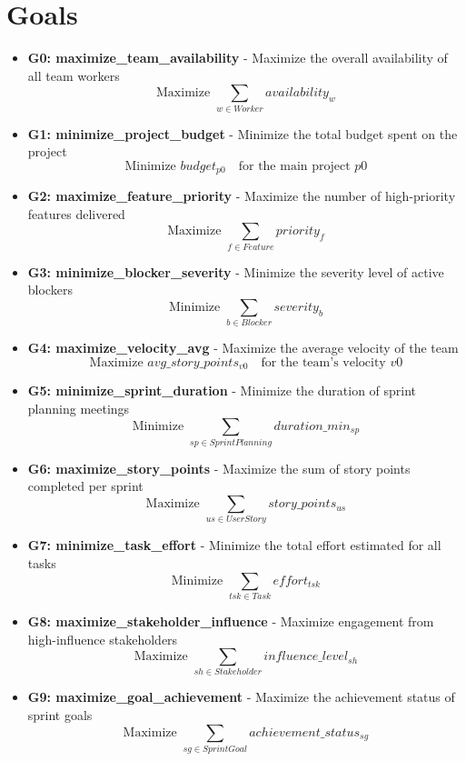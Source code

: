 \documentclass{article}
\begin{document}
\section{Goals}
\begin{itemize}
    \item \textbf{G0: maximize\_team\_availability} - Maximize the overall availability of all team workers
        \[ \text{Maximize } \sum_{w \in Worker} availability_w \]
    \item \textbf{G1: minimize\_project\_budget} - Minimize the total budget spent on the project
        \[ \text{Minimize } budget_{p0} \quad \text{for the main project } p0 \]
    \item \textbf{G2: maximize\_feature\_priority} - Maximize the number of high-priority features delivered
        \[ \text{Maximize } \sum_{f \in Feature} priority_f \]
    \item \textbf{G3: minimize\_blocker\_severity} - Minimize the severity level of active blockers
        \[ \text{Minimize } \sum_{b \in Blocker} severity_b \]
    \item \textbf{G4: maximize\_velocity\_avg} - Maximize the average velocity of the team
        \[ \text{Maximize } avg\_story\_points_{v0} \quad \text{for the team's velocity } v0 \]
    \item \textbf{G5: minimize\_sprint\_duration} - Minimize the duration of sprint planning meetings
        \[ \text{Minimize } \sum_{sp \in SprintPlanning} duration\_min_{sp} \]
    \item \textbf{G6: maximize\_story\_points} - Maximize the sum of story points completed per sprint
        \[ \text{Maximize } \sum_{us \in UserStory} story\_points_{us} \]
    \item \textbf{G7: minimize\_task\_effort} - Minimize the total effort estimated for all tasks
        \[ \text{Minimize } \sum_{tsk \in Task} effort_{tsk} \]
    \item \textbf{G8: maximize\_stakeholder\_influence} - Maximize engagement from high-influence stakeholders
        \[ \text{Maximize } \sum_{sh \in Stakeholder} influence\_level_{sh} \]
    \item \textbf{G9: maximize\_goal\_achievement} - Maximize the achievement status of sprint goals
        \[ \text{Maximize } \sum_{sg \in SprintGoal} achievement\_status_{sg} \]
\end{itemize}
\end{document}
